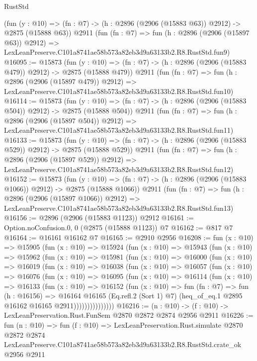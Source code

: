 \begin{lexlean}{RustStd}
\begin{coremodule}
    (fun (y : @10) => (fn : @7) -> (h : @2896 (@2906 (@15883 @63)) @2912) -> @2875 (@15888 @63))
    @2911
    (fun (fn : @7) =>
    fun (h : @2896 (@2906 (@15897 @63)) @2912) =>
    LexLeanPreserve.C101a8741ae58b573a82eb3d9a63133b2.R8.RustStd.fun9)
@16095 := @15873
    (fun (y : @10) => (fn : @7) -> (h : @2896 (@2906 (@15883 @479)) @2912) -> @2875 (@15888 @479))
    @2911
    (fun (fn : @7) =>
    fun (h : @2896 (@2906 (@15897 @479)) @2912) =>
    LexLeanPreserve.C101a8741ae58b573a82eb3d9a63133b2.R8.RustStd.fun10)
@16114 := @15873
    (fun (y : @10) => (fn : @7) -> (h : @2896 (@2906 (@15883 @504)) @2912) -> @2875 (@15888 @504))
    @2911
    (fun (fn : @7) =>
    fun (h : @2896 (@2906 (@15897 @504)) @2912) =>
    LexLeanPreserve.C101a8741ae58b573a82eb3d9a63133b2.R8.RustStd.fun11)
@16133 := @15873
    (fun (y : @10) => (fn : @7) -> (h : @2896 (@2906 (@15883 @529)) @2912) -> @2875 (@15888 @529))
    @2911
    (fun (fn : @7) =>
    fun (h : @2896 (@2906 (@15897 @529)) @2912) =>
    LexLeanPreserve.C101a8741ae58b573a82eb3d9a63133b2.R8.RustStd.fun12)
@16152 := @15873
    (fun (y : @10) => (fn : @7) -> (h : @2896 (@2906 (@15883 @1066)) @2912) -> @2875 (@15888 @1066))
    @2911
    (fun (fn : @7) =>
    fun (h : @2896 (@2906 (@15897 @1066)) @2912) =>
    LexLeanPreserve.C101a8741ae58b573a82eb3d9a63133b2.R8.RustStd.fun13)
@16156 := @2896 (@2906 (@15883 @1123)) @2912
@16161 := Option.noConfusion.{0, 0} (@2875 (@15888 @1123)) @7
@16162 := @817 @7
@16164 := @16161 @16162 @7
@16165 := @2910 @2956
@16208 := fun (x : @10) =>
  @15905
    (fun (x : @10) =>
    @15924
      (fun (x : @10) =>
      @15943
        (fun (x : @10) =>
        @15962
          (fun (x : @10) =>
          @15981
            (fun (x : @10) =>
            @16000
              (fun (x : @10) =>
              @16019
                (fun (x : @10) =>
                @16038
                  (fun (x : @10) =>
                  @16057
                    (fun (x : @10) =>
                    @16076
                      (fun (x : @10) =>
                      @16095
                        (fun (x : @10) =>
                        @16114
                          (fun (x : @10) =>
                          @16133
                            (fun (x : @10) =>
                            @16152
                              (fun (x : @10) =>
                              fun (fn : @7) =>
                              fun (h : @16156) =>
                              @16164
                                @16165
                                (Eq.refl.{2} (Sort 1) @7)
                                (heq_of_eq.{1} @2895 @16162 @16165 @2911)))))))))))))))
@16216 := (n : @10) -> (f : @10) -> LexLeanPreservation.Rust.FunSem @2870 @2872 @2874 @2956 @2911
@16226 := fun (n : @10) =>
  fun (f : @10) =>
  LexLeanPreservation.Rust.simulate
    @2870
    @2872
    @2874
    LexLeanPreserve.C101a8741ae58b573a82eb3d9a63133b2.R8.RustStd.crate_ok
    @2956
    @2911
\end{coremodule}
\end{lexlean}
